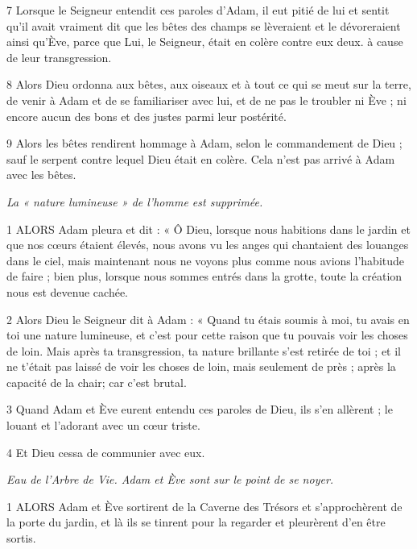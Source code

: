 \par 7 Lorsque le Seigneur entendit ces paroles d'Adam, il eut pitié de lui et sentit qu'il avait vraiment dit que les bêtes des champs se lèveraient et le dévoreraient ainsi qu'Ève, parce que Lui, le Seigneur, était en colère contre eux deux. à cause de leur transgression.

\par 8 Alors Dieu ordonna aux bêtes, aux oiseaux et à tout ce qui se meut sur la terre, de venir à Adam et de se familiariser avec lui, et de ne pas le troubler ni Ève ; ni encore aucun des bons et des justes parmi leur postérité.

\par 9 Alors les bêtes rendirent hommage à Adam, selon le commandement de Dieu ; sauf le serpent contre lequel Dieu était en colère. Cela n’est pas arrivé à Adam avec les bêtes.


\par \textit{La « nature lumineuse » de l'homme est supprimée.}

\par 1 ALORS Adam pleura et dit : « Ô Dieu, lorsque nous habitions dans le jardin et que nos cœurs étaient élevés, nous avons vu les anges qui chantaient des louanges dans le ciel, mais maintenant nous ne voyons plus comme nous avions l'habitude de faire ; bien plus, lorsque nous sommes entrés dans la grotte, toute la création nous est devenue cachée.

\par 2 Alors Dieu le Seigneur dit à Adam : « Quand tu étais soumis à moi, tu avais en toi une nature lumineuse, et c'est pour cette raison que tu pouvais voir les choses de loin. Mais après ta transgression, ta nature brillante s'est retirée de toi ; et il ne t'était pas laissé de voir les choses de loin, mais seulement de près ; après la capacité de la chair; car c’est brutal.

\par 3 Quand Adam et Ève eurent entendu ces paroles de Dieu, ils s'en allèrent ; le louant et l’adorant avec un cœur triste.

\par 4 Et Dieu cessa de communier avec eux.


\par \textit{Eau de l'Arbre de Vie. Adam et Ève sont sur le point de se noyer.}

\par 1 ALORS Adam et Ève sortirent de la Caverne des Trésors et s'approchèrent de la porte du jardin, et là ils se tinrent pour la regarder et pleurèrent d'en être sortis.

